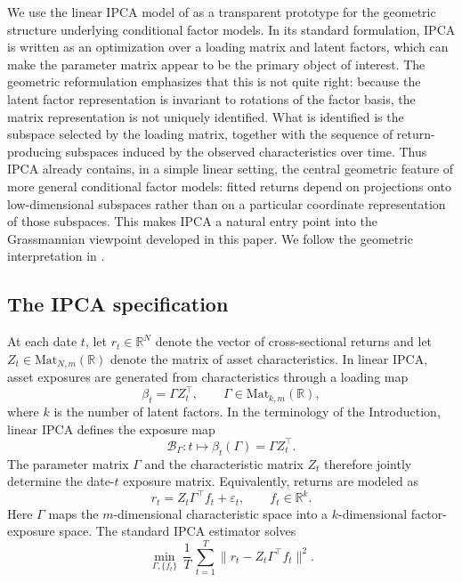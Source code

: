 \documentclass[11pt,letterpaper]{article}
\newcommand{\bR}{\mathbb{R}}
\newcommand{\cB}{\mathcal{B}}
\begin{document}
We use the linear IPCA model of \cite{KPS19,KPS20} as a transparent prototype for the geometric structure underlying conditional factor models. In its standard formulation, IPCA is written as an optimization over a loading matrix and latent factors, which can make the parameter matrix appear to be the primary object of interest. The geometric reformulation emphasizes that this is not quite right: because the latent factor representation is invariant to rotations of the factor basis, the matrix representation is not uniquely identified. What is identified is the subspace selected by the loading matrix, together with the sequence of return-producing subspaces induced by the observed characteristics over time. Thus IPCA already contains, in a simple linear setting, the central geometric feature of more general conditional factor models: fitted returns depend on projections onto low-dimensional subspaces rather than on a particular coordinate representation of those subspaces. This makes IPCA a natural entry point into the Grassmannian viewpoint developed in this paper. We follow the geometric interpretation in \cite{LM26}.

\subsection{The IPCA specification}
\label{sec:ipca:spec}

At each date $t$, let $r_t\in \bR^N$ denote the vector of cross-sectional returns and let $Z_t\in\mathrm{Mat}_{N,m}(\bR)$ denote the matrix of asset characteristics. In linear IPCA, asset exposures are generated from characteristics through a loading map
\begin{equation*}
\beta_t = \Gamma Z_t^\top, \qquad \Gamma\in \mathrm{Mat}_{k,m}(\bR),
\end{equation*}
where $k$ is the number of latent factors. In the terminology of the Introduction, linear IPCA defines the exposure map
\begin{equation*}
\cB_\Gamma : t \mapsto \beta_t(\Gamma)=\Gamma Z_t^\top .
\end{equation*}
The parameter matrix $\Gamma$ and the characteristic matrix $Z_t$ therefore jointly determine the date-$t$ exposure matrix. Equivalently, returns are modeled as
\begin{equation*}
r_t=Z_t\Gamma^\top f_t+\varepsilon_t,\qquad f_t\in \bR^k.
\end{equation*}
Here $\Gamma$ maps the $m$-dimensional characteristic space into a $k$-dimensional factor-exposure space. The standard IPCA estimator solves
\begin{equation*}
\min_{\Gamma,\{f_t\}}\,\frac{1}{T}\,\sum_{t=1}^T \|r_t-Z_t\Gamma^\top f_t\|^2.
\end{equation*}
\end{document}
